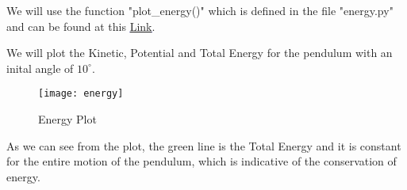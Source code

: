 \documentclass[12pt]{article}
\begin{document}
We will use the function "plot\_energy()" which is defined in the file "energy.py" and can be found at this
\textcolor{blue}{\underline{\href{https://github.com/kkin1995/simulations/energy.py}{Link}}}.

We will plot the Kinetic, Potential and Total Energy for the pendulum with an inital angle of $10^\circ$.

\begin{figure}[H]
    \centering
    \caption{Energy Plot}
    \texttt{[image: energy]}
    \label{fig:energy}
\end{figure}

As we can see from the plot, the green line is the Total Energy and it is constant for the entire motion of the pendulum, which is
indicative of the conservation of energy.
\end{document}
